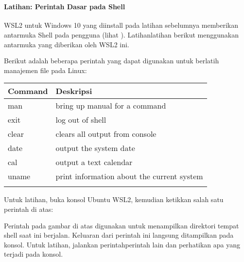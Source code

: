 \documentclass[letterpaper,10pt,english]{sphinxmanual}
\begin{document}
 


\paragraph{Latihan: Perintah Dasar pada Shell}
\label{\detokenize{sesi1/arsitektur:latihan-perintah-dasar-pada-shell}}
WSL2 untuk Windows 10 yang diinstall pada latihan sebelumnya memberikan antarmuka Shell pada pengguna (lihat {\hyperref[\detokenize{sesi1/pengantarlinux:wsl2}]{}}). Latihan\sphinxhyphen{}latihan berikut menggunakan antarmuka  yang diberikan oleh WSL2 ini.

Berikut adalah beberapa perintah yang dapat digunakan untuk berlatih manajemen file pada Linux:


\begin{savenotes}\sphinxattablestart
\centering
\begin{tabulary}{\linewidth}[t]{|T|T|}
\hline
\sphinxstyletheadfamily 
Command
&\sphinxstyletheadfamily 
Deskripsi
\\
\hline
man
&
bring up manual for a command
\\
\hline
exit
&
log out of shell
\\
\hline
clear
&
clears all output from console
\\
\hline
date
&
output the system date
\\
\hline
cal
&
output a text calendar
\\
\hline
uname
&
print information about the current system
\\
\hline

&

\\
\hline
\end{tabulary}
\par
\sphinxattableend\end{savenotes}

Untuk latihan, buka konsol Ubuntu WSL2, kemudian ketikkan salah satu perintah di atas:


Perintah  pada gambar di atas digunakan untuk menampilkan direktori tempat shell saat ini berjalan. Keluaran dari perintah ini langsung ditampilkan pada konsol. Untuk latihan, jalankan perintah\sphinxhyphen{}perintah lain dan perhatikan apa yang terjadi pada konsol.

 
\end{document}

